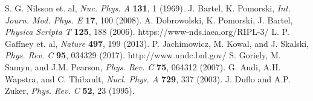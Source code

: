 \documentclass[a4paper,polish,twoside]{article}
\numberwithin{equation}{section}
\begin{document}
\begin{thebibliography}{9}
S. G. Nilsson et. al, \textit{Nuc. Phys. A} \textbf{131}, 1 (1969).
J. Bartel, K. Pomorski, \textit{Int. Journ. Mod. Phys. E} \textbf{17}, 100 (2008).
A. Dobrowolski, K. Pomorski, J. Bartel, \textit{Physica Scripta T} \textbf{125}, 188 (2006). 
https://www-nds.iaea.org/RIPL-3/
L. P. Gaffney et. al, \textit{Nature}  \textbf{497}, 199 (2013). 
P. Jachimowicz, M. Kowal, and J. Skalski, \textit{Phys. Rev. C} \textbf{95}, 034329 (2017).
http://www.nndc.bnl.gov/
S. Goriely, M. Samyn, and J.M. Pearson,  \textit{Phys. Rev. C} \textbf{75}, 064312 (2007).
G. Audi, A.H. Wapstra, and C. Thibault,  \textit{Nucl. Phys. A} \textbf{729}, 337 (2003).
J. Duflo and A.P. Zuker, \textit{Phys. Rev. C} \textbf{52}, 23 (1995).

\end{thebibliography}
\end{document}
